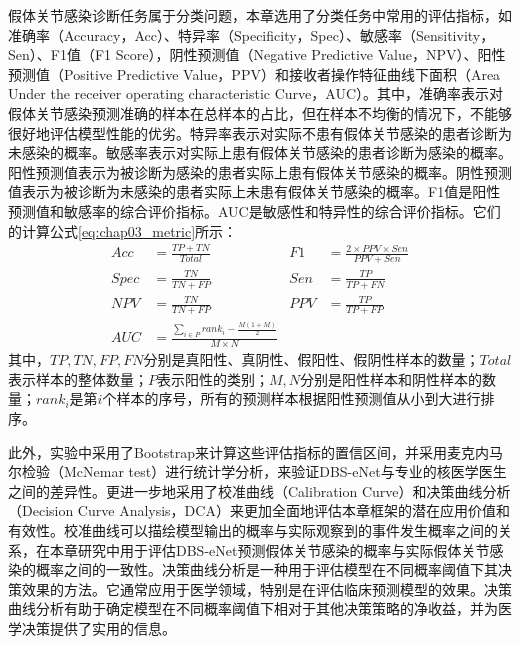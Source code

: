 假体关节感染诊断任务属于分类问题，本章选用了分类任务中常用的评估指标，如准确率（Accuracy，Acc）、特异率（Specificity，Spec）、敏感率（Sensitivity，Sen）、F1值（F1 Score），阴性预测值（Negative Predictive Value，NPV）、阳性预测值（Positive Predictive Value，PPV）和接收者操作特征曲线下面积（Area Under the receiver operating characteristic Curve，AUC）。其中，准确率表示对假体关节感染预测准确的样本在总样本的占比，但在样本不均衡的情况下，不能够很好地评估模型性能的优劣。特异率表示对实际不患有假体关节感染的患者诊断为未感染的概率。敏感率表示对实际上患有假体关节感染的患者诊断为感染的概率。阳性预测值表示为被诊断为感染的患者实际上患有假体关节感染的概率。阴性预测值表示为被诊断为未感染的患者实际上未患有假体关节感染的概率。F1值是阳性预测值和敏感率的综合评价指标。AUC是敏感性和特异性的综合评价指标。它们的计算公式\ref{eq:chap03_metric}所示：
\begin{equation}
  \begin{aligned}
    Acc  & = \frac{TP+TN}{Total}                                         & F1  & = \frac{2 \times PPV \times Sen}{PPV + Sen} \\
    Spec & = \frac{TN}{TN+FP}                                            & Sen & = \frac{TP}{TP+FN}                          \\
    NPV  & = \frac{TN}{TN+FP}                                            & PPV & = \frac{TP}{TP+FP}                          \\
    AUC  & = \frac{\sum_{i \in P} rank_i - \frac{M(1+M)}{2}}{M \times N} &     &
  \end{aligned}
  \label{eq:chap03_metric}
\end{equation}
其中，\(TP,TN,FP,FN\)分别是真阳性、真阴性、假阳性、假阴性样本的数量；\(Total\)表示样本的整体数量；\(P\)表示阳性的类别；\(M,N\)分别是阳性样本和阴性样本的数量；\(rank_i\)是第\(i\)个样本的序号，所有的预测样本根据阳性预测值从小到大进行排序。

此外，实验中采用了Bootstrap\cite{hesterberg2011bootstrap}来计算这些评估指标的置信区间，并采用麦克内马尔检验（McNemar test）\cite{lachenbruch2014mcnemar}进行统计学分析，来验证DBS-eNet与专业的核医学医生之间的差异性。更进一步地采用了校准曲线（Calibration Curve）和决策曲线分析（Decision Curve Analysis，DCA）\cite{vickers2006decision}来更加全面地评估本章框架的潜在应用价值和有效性。校准曲线可以描绘模型输出的概率与实际观察到的事件发生概率之间的关系，在本章研究中用于评估DBS-eNet预测假体关节感染的概率与实际假体关节感染的概率之间的一致性。决策曲线分析是一种用于评估模型在不同概率阈值下其决策效果的方法。它通常应用于医学领域，特别是在评估临床预测模型的效果。决策曲线分析有助于确定模型在不同概率阈值下相对于其他决策策略的净收益，并为医学决策提供了实用的信息。

